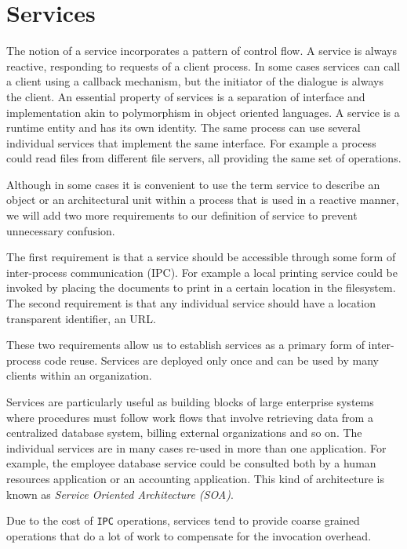 \section{Services}
\label{sec:services}

The notion of a service incorporates a pattern of control flow. A service is always reactive, responding to requests of a client process. In some cases
services can call a client using a callback mechanism, but the initiator of the dialogue is always the client. An essential property of services is a
separation of interface and implementation akin to polymorphism in object oriented languages. A service is a runtime entity and has its own identity.
The same process can use several individual services that implement the same interface. For example a process could read files from different file
servers, all providing the same set of operations.

Although in some cases it is convenient to use the term service to describe an object or an architectural unit within a process that is used in
a reactive manner, we will add two more requirements to our definition of service to prevent unnecessary confusion.

The first requirement is that a service should be accessible through some form of inter-process communication (IPC). For example a local printing service
could be invoked by placing the documents to print in a certain location in the filesystem. The second requirement is that any individual service
should have a location transparent identifier, an URL.

These two requirements allow us to establish services as a primary form of inter-process code reuse. Services are deployed only once and can be used
by many clients within an organization.

Services are particularly useful as building blocks of large enterprise systems where procedures must follow work flows that involve retrieving data
from a centralized database system, billing external organizations and so on. The individual services are in many cases re-used in more than one
application. For example, the employee database service could be consulted both by a human resources application or an accounting application.
This kind of architecture is known as \emph{Service Oriented Architecture (SOA)}.

Due to the cost of \texttt{IPC} operations, services tend to provide coarse grained operations that do a lot of work to compensate for the invocation
overhead.

